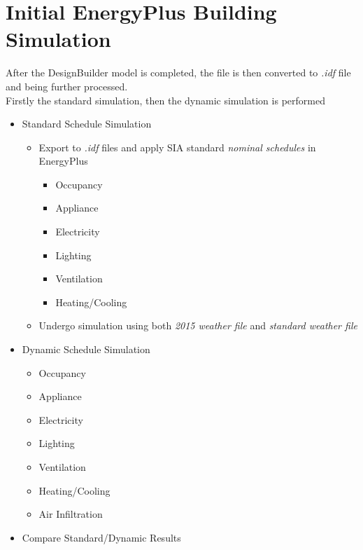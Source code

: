 \documentclass[11pt, a4paper]{article}
\theoremstyle{definition}
\begin{document}
\section{Initial EnergyPlus Building Simulation}
	After the DesignBuilder model is completed, the file is then converted to \textit{.idf} file and being further processed.\\
	Firstly the standard simulation, then the dynamic simulation is performed
	\begin{itemize}
		\item Standard Schedule Simulation
		\begin{itemize}
			\item Export to \textit{.idf} files and apply SIA standard \textit{nominal schedules} in EnergyPlus
			\begin{itemize}
				\item Occupancy
				\item Appliance
				\item Electricity
				\item Lighting
				\item Ventilation
				\item Heating/Cooling
			\end{itemize}
			
			\item Undergo simulation using both \textit{2015 weather file} and \textit{standard weather file}
		\end{itemize}
		\item Dynamic Schedule Simulation
			\begin{itemize}
				\item Occupancy
				\item Appliance
				\item Electricity
				\item Lighting
				\item Ventilation
				\item Heating/Cooling
				\item Air Infiltration
			\end{itemize}
		\item Compare Standard/Dynamic Results	
	\end{itemize}
	
\end{document}
